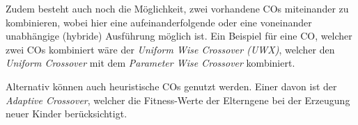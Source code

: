 	Zudem besteht auch noch die Möglichkeit, zwei vorhandene COs miteinander zu kombinieren, wobei hier eine aufeinanderfolgende oder eine voneinander unabhängige (hybride) Ausführung möglich ist. Ein Beispiel für eine CO, welcher zwei COs kombiniert wäre der \textit{Uniform Wise Crossover (UWX)}, welcher den \textit{Uniform Crossover} mit dem \textit{Parameter Wise Crossover} kombiniert. \cite{ElectromagneticRealEncoding}
	
	Alternativ können auch heuristische COs genutzt werden. Einer davon ist der \textit{Adaptive Crossover}, welcher die Fitness-Werte der Elterngene bei der Erzeugung neuer Kinder berücksichtigt.